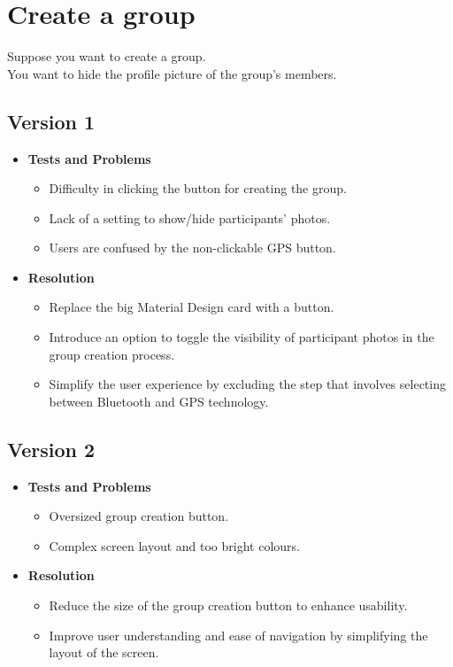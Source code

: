\documentclass[10pt,a4paper]{article}
\begin{document}
\newpage
\section*{Create a group}
Suppose you want to create a group. \\
You want to hide the profile picture of the group's members.
\subsection*{Version 1}
\begin{itemize}
    \item \textbf{Tests and Problems}
    \begin{itemize}
        \item Difficulty in clicking the button for creating the group.
        \item Lack of a setting to show/hide participants' photos.
        \item Users are confused by the non-clickable GPS button.
    \end{itemize}
    \item \textbf{Resolution}
    \begin{itemize}
        \item Replace the big Material Design card with a button.    
        \item Introduce an option to toggle the visibility of participant photos in the group creation process.
        \item Simplify the user experience by excluding the step that involves selecting between Bluetooth and GPS technology.
    \end{itemize}
\end{itemize}

\subsection*{Version 2}
\begin{itemize}
    \item \textbf{Tests and Problems}
    \begin{itemize}
        \item Oversized group creation button.
        \item Complex screen layout and too bright colours.
    \end{itemize}
    \item \textbf{Resolution}
    \begin{itemize}
        \item Reduce the size of the group creation button to enhance usability.
        \item Improve user understanding and ease of navigation by simplifying the layout of the screen.
    \end{itemize}
\end{itemize}
\end{document}
